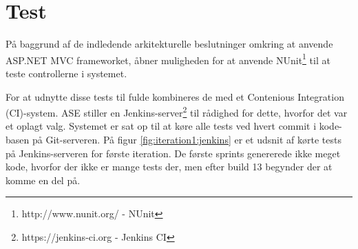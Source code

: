\section{Test}

På baggrund af de indledende arkitekturelle beslutninger omkring at anvende ASP.NET MVC frameworket, åbner muligheden for at anvende NUnit\footnote{http://www.nunit.org/ - NUnit} til at teste controllerne i systemet.

For at udnytte disse tests til fulde kombineres de med et Contenious Integration (CI)-system. ASE stiller en Jenkins-server\footnote{https://jenkins-ci.org - Jenkins CI} til rådighed for dette, hvorfor det var et oplagt valg. 
Systemet er sat op til at køre alle tests ved hvert commit i kode-basen på Git-serveren. På figur \ref{fig:iteration1:jenkins} er et udsnit af kørte tests på Jenkins-serveren for første iteration. De første sprints genererede ikke meget kode, hvorfor der ikke er mange tests der, men efter build 13 begynder der at komme en del på.




